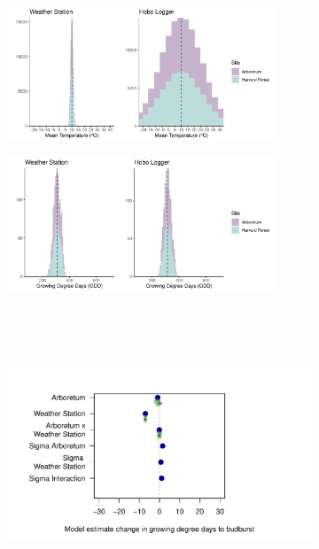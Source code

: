 \documentclass{article}\usepackage[]{graphicx}\usepackage[]{color}
\begin{document}
\begin{figure}
  \begin{subfigure}{.5\linewidth}
    \caption{}
    \centering
    \includegraphics[height=4cm, width=8cm]{..//analyses/figures/clim_methods_micros.pdf}
    \label{fig:climmicros}
  \end{subfigure}%
    \begin{subfigure}{.5\linewidth}
      \caption{}
      \centering
      \includegraphics[height=4cm, width=8cm]{..//analyses/figures/gdd_methods_micros.pdf}
    \label{fig:gddmicros}
  \end{subfigure}\\[1ex]
  \begin{subfigure}{\linewidth}
	    \caption{}
      \centering
      \includegraphics[height=7cm, width=11cm]{..//analyses/figures/muplot_micros.pdf}
      \label{fig:muplotmicros}
  \end{subfigure}

\end{figure}
\end{document}
